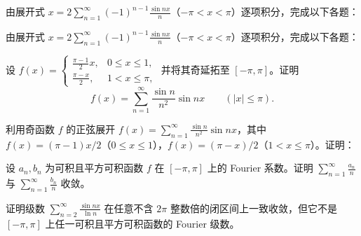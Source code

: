 \noindent\begin{minipage}{\textwidth}
由展开式 $\displaystyle x=2\sum_{n=1}^\infty(-1)^{n-1}\frac{\sin nx}n$（$-\pi<x<\pi$）逐项积分，完成以下各题：
\end{minipage}\par\vfill
\noindent\begin{minipage}{\textwidth}
由展开式 $\displaystyle x=2\sum_{n=1}^\infty(-1)^{n-1}\frac{\sin nx}n$（$-\pi<x<\pi$）逐项积分，完成以下各题：
\end{minipage}\par\vfill
\newpage
\noindent\begin{minipage}{\textwidth}
设 $\displaystyle f(x)=\begin{cases}\frac{\pi-1}2x,&0\le x\le1,\\\frac{\pi-x}2,&1<x\le\pi,\end{cases}$ 并将其奇延拓至 $[-\pi,\pi]$。证明 \[f(x)=\sum_{n=1}^\infty\frac{\sin n}{n^2}\sin nx\qquad(|x|\le\pi).\]
\end{minipage}\par\vfill
\noindent\begin{minipage}{\textwidth}
利用奇函数 $f$ 的正弦展开 $\displaystyle f(x)=\sum_{n=1}^\infty\frac{\sin n}{n^2}\sin nx$，其中 $f(x)=(\pi-1)x/2$（$0\le x\le1$），$f(x)=(\pi-x)/2$（$1<x\le\pi$）。证明：
\end{minipage}\par\vfill
\noindent\begin{minipage}{\textwidth}
设 $a_n,b_n$ 为可积且平方可积函数 $f$ 在 $[-\pi,\pi]$ 上的 Fourier 系数。证明 $\displaystyle\sum_{n=1}^\infty\frac{a_n}n$ 与 $\displaystyle\sum_{n=1}^\infty\frac{b_n}n$ 收敛。
\end{minipage}\par\vfill
\newpage
\noindent\begin{minipage}{\textwidth}
证明级数 $\displaystyle\sum_{n=2}^\infty\frac{\sin nx}{\ln n}$ 在任意不含 $2\pi$ 整数倍的闭区间上一致收敛，但它不是 $[-\pi,\pi]$ 上任一可积且平方可积函数的 Fourier 级数。
\end{minipage}\par\vfill
